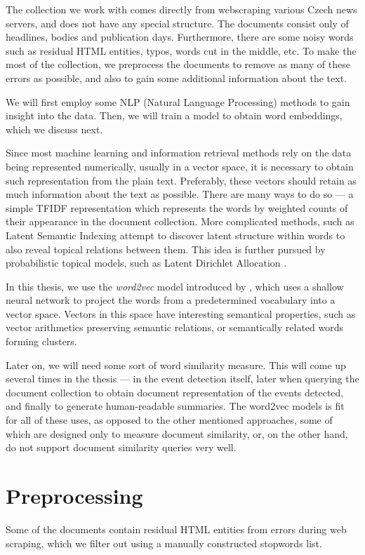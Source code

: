 The collection we work with comes directly from webscraping various Czech news servers, and does not have any special structure. The documents consist only of headlines, bodies and publication days. Furthermore, there are some noisy words such as residual HTML entities, typos, words cut in the middle, etc. To make the most of the collection, we preprocess the documents to remove as many of these errors as possible, and also to gain some additional information about the text.

We will first employ some NLP (Natural Language Processing) methods to gain insight into the data. Then, we will train a model to obtain word embeddings, which we discuss next.

Since most machine learning and information retrieval methods rely on the data being represented numerically, usually in a vector space, it is necessary to obtain such representation from the plain text. Preferably, these vectors should retain as much information about the text as possible. There are many ways to do so --- a simple TFIDF representation \cite{information-retrieval} which represents the words by weighted counts of their appearance in the document collection. More complicated methods, such as Latent Semantic Indexing \cite{lsi} attempt to discover latent structure within words to also reveal topical relations between them. This idea is further pursued by probabilistic topical models, such as Latent Dirichlet Allocation \cite{lda}.

In this thesis, we use the \textit{word2vec} model introduced by \cite{word2vec, distributed-representations, linguistic-regularities}, which uses a shallow neural network to project the words from a predetermined vocabulary into a vector space. Vectors in this space have interesting semantical properties, such as vector arithmetics preserving semantic relations, or semantically related words forming clusters.

Later on, we will need some sort of word similarity measure. This will come up several times in the thesis --- in the event detection itself, later when querying the document collection to obtain document representation of the events detected, and finally to generate human-readable summaries. The word2vec models is fit for all of these uses, as opposed to the other mentioned approaches, some of which are designed only to measure document similarity, or, on the other hand, do not support document similarity queries very well.


\section{Preprocessing}
Some of the documents contain residual HTML entities from errors during web scraping, which we filter out using a manually constructed stopwords list.

